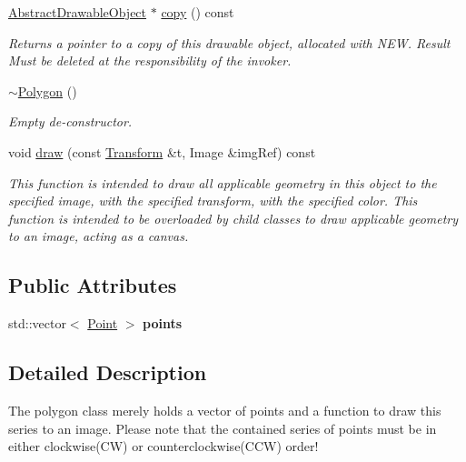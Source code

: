\begin{DoxyCompactItemize}
\mbox{\label{classcturtle_1_1Polygon_ad03f061d4f109125994b8613ccb3864a}} 
\hyperlink{classcturtle_1_1AbstractDrawableObject}{Abstract\+Drawable\+Object} $\ast$ \hyperlink{classcturtle_1_1Polygon_ad03f061d4f109125994b8613ccb3864a}{copy} () const
\begin{DoxyCompactList}\small\item\em Returns a pointer to a copy of this drawable object, allocated with N\+EW. Result Must be deleted at the responsibility of the invoker. \end{DoxyCompactList}\item 
\mbox{\label{classcturtle_1_1Polygon_a2e46bf1ab58d9cf5cd78fdf0137deedf}} 
\hyperlink{classcturtle_1_1Polygon_a2e46bf1ab58d9cf5cd78fdf0137deedf}{$\sim$\+Polygon} ()
\begin{DoxyCompactList}\small\item\em Empty de-\/constructor. \end{DoxyCompactList}\item 
void \hyperlink{classcturtle_1_1Polygon_a4a0b6c44656957b141b74bd5c1542622}{draw} (const \hyperlink{classcturtle_1_1Transform}{Transform} \&t, Image \&img\+Ref) const
\begin{DoxyCompactList}\small\item\em This function is intended to draw all applicable geometry in this object to the specified image, with the specified transform, with the specified color. This function is intended to be overloaded by child classes to draw applicable geometry to an image, acting as a canvas. \end{DoxyCompactList}\end{DoxyCompactItemize}
\subsection*{Public Attributes}
\begin{DoxyCompactItemize}
\item 
\mbox{\label{classcturtle_1_1Polygon_a384a2dba19b3181382c6d40c1c374cfe}} 
std\+::vector$<$ \hyperlink{structcturtle_1_1ivec2}{Point} $>$ {\bfseries points}
\end{DoxyCompactItemize}


\subsection{Detailed Description}
The polygon class merely holds a vector of points and a function to draw this series to an image. Please note that the contained series of points must be in either clockwise(\+C\+W) or counterclockwise(\+C\+C\+W) order! 

